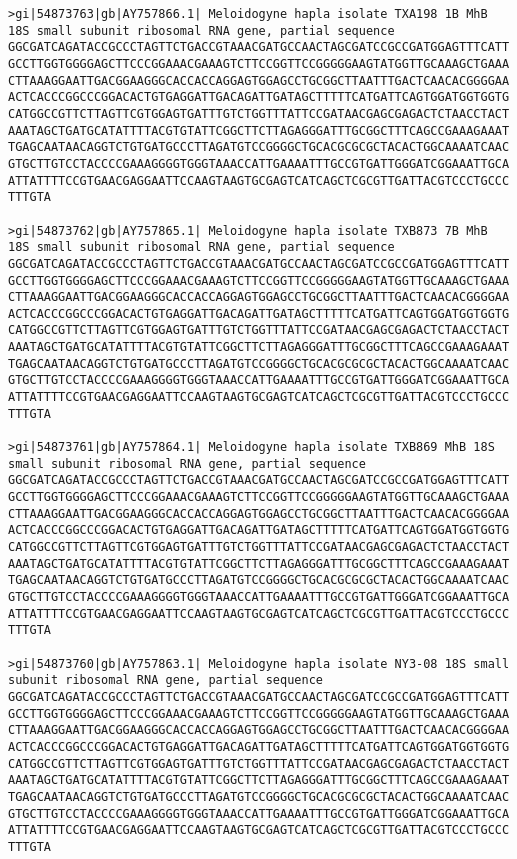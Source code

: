 \documentclass[11pt]{article}
\begin{document}
\begin{Verbatim}[commandchars=\\\{\}]
>gi|54873763|gb|AY757866.1| Meloidogyne hapla isolate TXA198 1B MhB 18S small subunit ribosomal RNA gene, partial sequence
GGCGATCAGATACCGCCCTAGTTCTGACCGTAAACGATGCCAACTAGCGATCCGCCGATGGAGTTTCATT
GCCTTGGTGGGGAGCTTCCCGGAAACGAAAGTCTTCCGGTTCCGGGGGAAGTATGGTTGCAAAGCTGAAA
CTTAAAGGAATTGACGGAAGGGCACCACCAGGAGTGGAGCCTGCGGCTTAATTTGACTCAACACGGGGAA
ACTCACCCGGCCCGGACACTGTGAGGATTGACAGATTGATAGCTTTTTCATGATTCAGTGGATGGTGGTG
CATGGCCGTTCTTAGTTCGTGGAGTGATTTGTCTGGTTTATTCCGATAACGAGCGAGACTCTAACCTACT
AAATAGCTGATGCATATTTTACGTGTATTCGGCTTCTTAGAGGGATTTGCGGCTTTCAGCCGAAAGAAAT
TGAGCAATAACAGGTCTGTGATGCCCTTAGATGTCCGGGGCTGCACGCGCGCTACACTGGCAAAATCAAC
GTGCTTGTCCTACCCCGAAAGGGGTGGGTAAACCATTGAAAATTTGCCGTGATTGGGATCGGAAATTGCA
ATTATTTTCCGTGAACGAGGAATTCCAAGTAAGTGCGAGTCATCAGCTCGCGTTGATTACGTCCCTGCCC
TTTGTA

>gi|54873762|gb|AY757865.1| Meloidogyne hapla isolate TXB873 7B MhB 18S small subunit ribosomal RNA gene, partial sequence
GGCGATCAGATACCGCCCTAGTTCTGACCGTAAACGATGCCAACTAGCGATCCGCCGATGGAGTTTCATT
GCCTTGGTGGGGAGCTTCCCGGAAACGAAAGTCTTCCGGTTCCGGGGGAAGTATGGTTGCAAAGCTGAAA
CTTAAAGGAATTGACGGAAGGGCACCACCAGGAGTGGAGCCTGCGGCTTAATTTGACTCAACACGGGGAA
ACTCACCCGGCCCGGACACTGTGAGGATTGACAGATTGATAGCTTTTTCATGATTCAGTGGATGGTGGTG
CATGGCCGTTCTTAGTTCGTGGAGTGATTTGTCTGGTTTATTCCGATAACGAGCGAGACTCTAACCTACT
AAATAGCTGATGCATATTTTACGTGTATTCGGCTTCTTAGAGGGATTTGCGGCTTTCAGCCGAAAGAAAT
TGAGCAATAACAGGTCTGTGATGCCCTTAGATGTCCGGGGCTGCACGCGCGCTACACTGGCAAAATCAAC
GTGCTTGTCCTACCCCGAAAGGGGTGGGTAAACCATTGAAAATTTGCCGTGATTGGGATCGGAAATTGCA
ATTATTTTCCGTGAACGAGGAATTCCAAGTAAGTGCGAGTCATCAGCTCGCGTTGATTACGTCCCTGCCC
TTTGTA

>gi|54873761|gb|AY757864.1| Meloidogyne hapla isolate TXB869 MhB 18S small subunit ribosomal RNA gene, partial sequence
GGCGATCAGATACCGCCCTAGTTCTGACCGTAAACGATGCCAACTAGCGATCCGCCGATGGAGTTTCATT
GCCTTGGTGGGGAGCTTCCCGGAAACGAAAGTCTTCCGGTTCCGGGGGAAGTATGGTTGCAAAGCTGAAA
CTTAAAGGAATTGACGGAAGGGCACCACCAGGAGTGGAGCCTGCGGCTTAATTTGACTCAACACGGGGAA
ACTCACCCGGCCCGGACACTGTGAGGATTGACAGATTGATAGCTTTTTCATGATTCAGTGGATGGTGGTG
CATGGCCGTTCTTAGTTCGTGGAGTGATTTGTCTGGTTTATTCCGATAACGAGCGAGACTCTAACCTACT
AAATAGCTGATGCATATTTTACGTGTATTCGGCTTCTTAGAGGGATTTGCGGCTTTCAGCCGAAAGAAAT
TGAGCAATAACAGGTCTGTGATGCCCTTAGATGTCCGGGGCTGCACGCGCGCTACACTGGCAAAATCAAC
GTGCTTGTCCTACCCCGAAAGGGGTGGGTAAACCATTGAAAATTTGCCGTGATTGGGATCGGAAATTGCA
ATTATTTTCCGTGAACGAGGAATTCCAAGTAAGTGCGAGTCATCAGCTCGCGTTGATTACGTCCCTGCCC
TTTGTA

>gi|54873760|gb|AY757863.1| Meloidogyne hapla isolate NY3-08 18S small subunit ribosomal RNA gene, partial sequence
GGCGATCAGATACCGCCCTAGTTCTGACCGTAAACGATGCCAACTAGCGATCCGCCGATGGAGTTTCATT
GCCTTGGTGGGGAGCTTCCCGGAAACGAAAGTCTTCCGGTTCCGGGGGAAGTATGGTTGCAAAGCTGAAA
CTTAAAGGAATTGACGGAAGGGCACCACCAGGAGTGGAGCCTGCGGCTTAATTTGACTCAACACGGGGAA
ACTCACCCGGCCCGGACACTGTGAGGATTGACAGATTGATAGCTTTTTCATGATTCAGTGGATGGTGGTG
CATGGCCGTTCTTAGTTCGTGGAGTGATTTGTCTGGTTTATTCCGATAACGAGCGAGACTCTAACCTACT
AAATAGCTGATGCATATTTTACGTGTATTCGGCTTCTTAGAGGGATTTGCGGCTTTCAGCCGAAAGAAAT
TGAGCAATAACAGGTCTGTGATGCCCTTAGATGTCCGGGGCTGCACGCGCGCTACACTGGCAAAATCAAC
GTGCTTGTCCTACCCCGAAAGGGGTGGGTAAACCATTGAAAATTTGCCGTGATTGGGATCGGAAATTGCA
ATTATTTTCCGTGAACGAGGAATTCCAAGTAAGTGCGAGTCATCAGCTCGCGTTGATTACGTCCCTGCCC
TTTGTA


\end{Verbatim}
\end{document}
